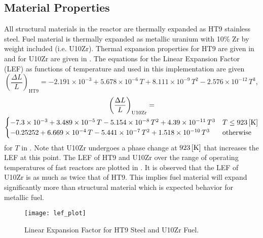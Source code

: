   \subsection{Material Properties}
    \label{sec:model_details__material_properties}
    All structural materials in the reactor are thermally expanded as HT9 
    stainless steel.
    Fuel material is thermally expanded as metallic uranium with 10\% Zr by 
    weight included (i.e. U10Zr). Thermal expansion properties for HT9 are given 
    in \cite{ht9Prop} and for U10Zr are given in \cite{thexpU10Zr}. The 
    equations for the Linear Expansion Factor (LEF) as functions of temperature 
    and used in this implementation are given
    \begin{equation}
      \label{eq:lef_ht9}
      \left( \frac{\Delta L}{L} \right)_{\text{HT9}} = 
        -2.191 \times 10^{-3} + 5.678 \times 10^{-6} \, T + 
        8.111 \times 10^{-9} \, T^2 - 2.576 \times 10^{-12} \, T^3 ,
    \end{equation}
    \begin{multline}
      \label{eq:lef_u10zr}
      \left( \frac{\Delta L}{L} \right)_{\text{U10Zr}} = \\
        \begin{cases}
          -7.3 \times 10^{-3} + 3.489 \times 10^{-5} \, T 
            - 5.154 \times 10^{-8} \, T^2 + 4.39 \times 10^{-11} \, T^3 & 
            T \le 923 \left[\text{{K}}\right] \\
          -0.25252 + 6.669 \times 10^{-4} \, T - 5.441 \times 10^{-7} \, T^2 
            + 1.518 \times 10^{-10} \, T^3 & \text{otherwise}
        \end{cases}
    \end{multline}
    for $T$ in . Note that U10Zr undergoes a phase change at 
    $923 \left[\text{{K}}\right]$ that increases the LEF at this point. The LEF of HT9 and 
    U10Zr over the range of operating temperatures of fast reactors are plotted 
    in . It is observed that the LEF of U10Zr is as much as 
    twice that of HT9. This implies fuel material will expand significantly more 
    than structural material which is expected behavior for metallic fuel.

    \begin{figure}
      \centering
      \texttt{[image: lef\_plot]}
      \caption{Linear Expansion Factor for HT9 Steel and U10Zr Fuel.}
      \label{fig:lef_plot}
    \end{figure}
    
